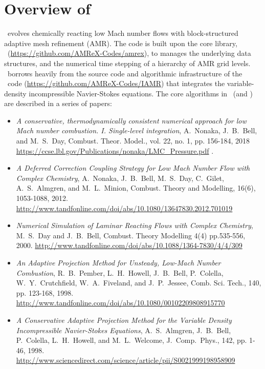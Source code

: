 
\section{Overview of \pelelm}

\pelelm\ evolves chemically reacting low Mach number flows with block-structured adaptive mesh refinement (AMR).
The code is built upon the core library, \amrex\ (\url{https://github.com/AMReX-Codes/amrex}),
to manages the underlying data structures, and the numerical time stepping of
a hierarchy of AMR grid levels. \pelelm\ borrows heavily
from the source code and algorithmic infrastructure of the \iamr\ code (\url{https://github.com/AMReX-Codes/IAMR})
that integrates the variable-density incompressible Navier-Stokes equations.
The core algorithms in \pelelm\ (and \iamr) are described in a series of papers:

\begin{itemize}

\item {\it A conservative, thermodynamically consistent numerical approach for low Mach number 
combustion. I. Single-level integration},
A.~Nonaka, J.~B.~Bell, and M.~S.~Day, Combust. Theor. Model., vol. 22, no. 1, pp. 156-184, 2018
\url{https://ccse.lbl.gov/Publications/nonaka/LMC_Pressure.pdf} \cite{LMC-P}.

\item {\it A Deferred Correction Coupling Strategy for Low Mach Number Flow with Complex Chemistry},
A.~Nonaka, J.~B.~Bell, M.~S.~Day, C.~Gilet, A.~S.~Almgren, and M.~L.~Minion,
Combust. Theory and Modelling, 16(6), 1053-1088, 2012. 
\url{http://www.tandfonline.com/doi/abs/10.1080/13647830.2012.701019} \cite{LMC_SDC}

\item {\it Numerical Simulation of Laminar Reacting Flows with Complex Chemistry},
M.~S.~Day and J.~B.~Bell,
Combust. Theory Modelling 4(4) pp.535-556, 2000.
\url{http://www.tandfonline.com/doi/abs/10.1088/1364-7830/4/4/309} \cite{DayBell:2000}

\item {\it An Adaptive Projection Method for Unsteady, Low-Mach Number Combustion}, 
R.~B.~Pember, L.~H.~Howell, J.~B.~Bell, P.~Colella, W.~Y.~Crutchfield, W.~A.~Fiveland, and J.~P.~Jessee,
Comb. Sci. Tech., 140, pp. 123-168, 1998.
\url{http://www.tandfonline.com/doi/abs/10.1080/00102209808915770} \cite{pember-flame}

\item {\it A Conservative Adaptive Projection Method for the Variable Density Incompressible Navier-Stokes Equations},
A.~S.~Almgren, J.~B.~Bell, P.~Colella, L.~H.~Howell, and M.~L.~Welcome,
J.~Comp.~Phys., 142, pp. 1-46, 1998.
\url{http://www.sciencedirect.com/science/article/pii/S0021999198958909} \cite{IAMR}

\end{itemize}         


